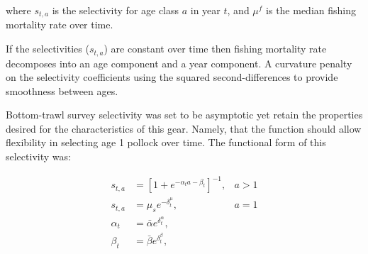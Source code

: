 \documentclass[11pt,
  english,
  a4paper,
]{article}
\begin{document}

where {\(s_{t,a}\)\leavevmode\tagmcend\tagstructend} is the selectivity for age class {\(a\)\leavevmode\tagmcend\tagstructend} in year {\(t\)\leavevmode\tagmcend\tagstructend}, and {\(\mu^f\)\leavevmode\tagmcend\tagstructend} is the median fishing mortality rate over time.

\leavevmode\tagmcend\tagstructend\par


If the selectivities ({\(s_{t,a}\)\leavevmode\tagmcend\tagstructend}) are constant over time then fishing mortality rate decomposes into an age component and a year component. A curvature penalty on the selectivity coefficients using the squared second-differences to provide smoothness between ages.

\leavevmode\tagmcend\tagstructend\par


Bottom-trawl survey selectivity was set to be asymptotic yet retain the properties desired for the characteristics of this gear. Namely, that the function should allow flexibility in selecting age 1 pollock over time. The functional form of this selectivity was:

\leavevmode\tagmcend\tagstructend\par


\begin{align}
    s_{t,a}     &= \left[ 1+e^{-\alpha_ta-\beta_t} \right]^{-1} , & a>1 \\
    s_{t,a}     &= \mu_se^{-\delta^\mu_t},                        & a=1 \\
    \alpha_{t}  &= \bar \alpha e^{\delta^\alpha_t},                     \\
    \beta_{t}  &= \bar \beta e^{\delta^\beta_t},                        
\end{align}

\leavevmode\tagmcend\tagstructend\par

\end{document}
